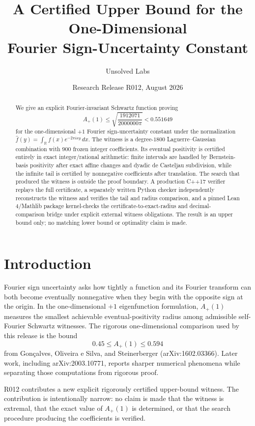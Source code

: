 \documentclass[11pt]{article}
\title{A Certified Upper Bound for the One-Dimensional\\Fourier Sign-Uncertainty Constant}
\author{Unsolved Labs}
\date{Research Release R012, August 2026}
\newcommand{\R}{\mathbb R}
\begin{document}
\maketitle

\begin{abstract}
We give an explicit Fourier-invariant Schwartz function proving
\[
A_+(1)\leq\sqrt{\frac{1912071}{2000000\pi}}<0.551649
\]
for the one-dimensional $+1$ Fourier sign-uncertainty constant under the normalization
$\widehat f(y)=\int_{\R}f(x)e^{-2\pi ixy}\,dx$.
The witness is a degree-$1800$ Laguerre--Gaussian combination with $900$ frozen integer coefficients.
Its eventual positivity is certified entirely in exact integer/rational arithmetic: finite intervals are handled by Bernstein-basis positivity after exact affine changes and dyadic de Casteljau subdivision, while the infinite tail is certified by nonnegative coefficients after translation.
The search that produced the witness is outside the proof boundary.
A production C++17 verifier replays the full certificate, a separately written Python checker independently reconstructs the witness and verifies the tail and radius comparison, and a pinned Lean 4/Mathlib package kernel-checks the certificate-to-exact-radius and decimal-comparison bridge under explicit external witness obligations.
The result is an upper bound only; no matching lower bound or optimality claim is made.
\end{abstract}

\section{Introduction}
Fourier sign uncertainty asks how tightly a function and its Fourier transform can both become eventually nonnegative when they begin with the opposite sign at the origin.
In the one-dimensional $+1$ eigenfunction formulation, $A_+(1)$ measures the smallest achievable eventual-positivity radius among admissible self-Fourier Schwartz witnesses.
The rigorous one-dimensional comparison used by this release is the bound
\[
0.45\leq A_+(1)\leq0.594
\]
from Gon\c{c}alves, Oliveira e Silva, and Steinerberger (arXiv:1602.03366).
Later work, including arXiv:2003.10771, reports sharper numerical phenomena while separating those computations from rigorous proof.

R012 contributes a new explicit rigorously certified upper-bound witness.
The contribution is intentionally narrow: no claim is made that the witness is extremal, that the exact value of $A_+(1)$ is determined, or that the search procedure producing the coefficients is verified.
\end{document}
